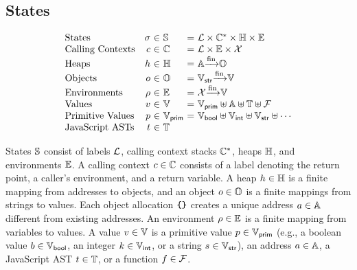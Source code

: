 \documentclass[10pt,conference]{IEEEtran}
\begin{document}
\subsection{States}

\[
  \begin{array}{lr@{~}c@{~}l@{~}c@{~}l}
    \text{States} & \st &\in& \stset &=&
    \labset \times \ctxtset^* \times \heapset \times \envset\\

    \text{Calling Contexts} & \ctxt &\in& \ctxtset &=&
    \labset \times \envset \times \varset\\

    \text{Heaps} & \heap &\in& \heapset &=&
    \addrset \finmap \objset\\

    \text{Objects} & \obj &\in& \objset &=&
    \strset \finmap \valset\\

    \text{Environments} & \env &\in& \envset &=&
    \varset \finmap \valset\\

    \text{Values} & \val &\in& \valset &=&
    \pvalset \uplus \addrset \uplus \treeset \uplus \funcset\\

    \text{Primitive Values} & \pval &\in& \pvalset &=&
    \boolset \uplus \intset \uplus \strset \uplus \cdots\\

    \text{JavaScript ASTs} & \tree &\in& \treeset\\
  \end{array}
\]

States $\mathbb{S}$ consist of labels $\mathcal{L}$, calling context stacks
$\mathbb{C}^*$, heaps $\mathbb{H}$, and environments $\mathbb{E}$.  A calling context
$c \in \mathbb{C}$ consists of a label denoting the return point, a caller's
environment, and a return variable.  A heap $h \in \mathbb{H}$ is a finite
mapping from addresses to objects, and an object $o \in \mathbb{O}$ is a finite
mappings from strings to values.  Each object allocation $\kwcl \kwcr$ creates a
unique address $a \in \mathbb{A}$ different from existing addresses.  An
environment $\rho \in \mathbb{E}$ is a finite mapping from variables to values. A
value $v \in \mathbb{V}$ is a primitive value $p \in \mathbb{V}_{\textsf{prim}}$ (e.g., a
boolean value $b \in \mathbb{V}_{\textsf{bool}}$, an integer $k \in \mathbb{V}_{\textsf{int}}$, or a string
$s \in \mathbb{V}_{\textsf{str}}$), an address $a \in \mathbb{A}$, a JavaScript AST $t
\in \mathbb{T}$, or a function $f \in \mathcal{F}$.
\end{document}
